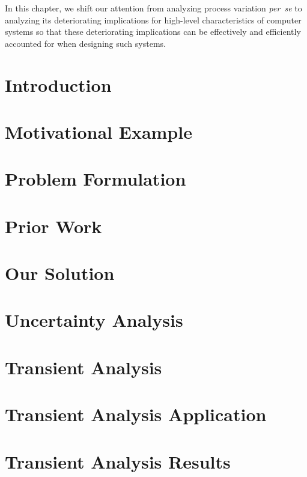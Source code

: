 In this chapter, we shift our attention from analyzing process variation
\emph{per~se} to analyzing its deteriorating implications for high-level
characteristics of computer systems so that these deteriorating implications can
be effectively and efficiently accounted for when designing such systems.

\section{Introduction}

\section{Motivational Example}

\section{Problem Formulation}

\section{Prior Work}

\section{Our Solution}

\section{Uncertainty Analysis}

\section{Transient Analysis}

\section{Transient Analysis Application}

\section{Transient Analysis Results}


